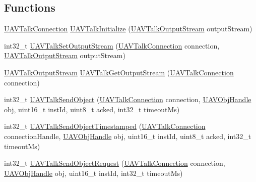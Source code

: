 \subsection*{\-Functions}
\begin{DoxyCompactItemize}
\item 
\hyperlink{group___u_a_v_talk_gaeff1721eaebd4ab306057b4017f23f36}{\-U\-A\-V\-Talk\-Connection} \hyperlink{group___u_a_v_talk_ga91e20b57ed132bab36c9ca723d9bdac4}{\-U\-A\-V\-Talk\-Initialize} (\hyperlink{group___u_a_v_talk_ga0c67fb4d23157d56fe1982e4788938c7}{\-U\-A\-V\-Talk\-Output\-Stream} output\-Stream)
\item 
int32\-\_\-t \hyperlink{group___u_a_v_talk_ga33f8221bbddbf94c7379c3230eac1501}{\-U\-A\-V\-Talk\-Set\-Output\-Stream} (\hyperlink{group___u_a_v_talk_gaeff1721eaebd4ab306057b4017f23f36}{\-U\-A\-V\-Talk\-Connection} connection, \hyperlink{group___u_a_v_talk_ga0c67fb4d23157d56fe1982e4788938c7}{\-U\-A\-V\-Talk\-Output\-Stream} output\-Stream)
\item 
\hyperlink{group___u_a_v_talk_ga0c67fb4d23157d56fe1982e4788938c7}{\-U\-A\-V\-Talk\-Output\-Stream} \hyperlink{group___u_a_v_talk_ga2f8c8d67e642f7df90500f38273baa61}{\-U\-A\-V\-Talk\-Get\-Output\-Stream} (\hyperlink{group___u_a_v_talk_gaeff1721eaebd4ab306057b4017f23f36}{\-U\-A\-V\-Talk\-Connection} connection)
\item 
int32\-\_\-t \hyperlink{group___u_a_v_talk_gab4fe52d9c33088b7ebbac9ad4e11b9de}{\-U\-A\-V\-Talk\-Send\-Object} (\hyperlink{group___u_a_v_talk_gaeff1721eaebd4ab306057b4017f23f36}{\-U\-A\-V\-Talk\-Connection} connection, \hyperlink{targets_2_u_a_v_objects_2inc_2uavobjectmanager_8h_a279053e22be53ce9f895043aaeb91e3b}{\-U\-A\-V\-Obj\-Handle} obj, uint16\-\_\-t inst\-Id, uint8\-\_\-t acked, int32\-\_\-t timeout\-Ms)
\item 
int32\-\_\-t \hyperlink{group___u_a_v_talk_gad5aea81015d8dd5ed7d474ac87fe58fc}{\-U\-A\-V\-Talk\-Send\-Object\-Timestamped} (\hyperlink{group___u_a_v_talk_gaeff1721eaebd4ab306057b4017f23f36}{\-U\-A\-V\-Talk\-Connection} connection\-Handle, \hyperlink{targets_2_u_a_v_objects_2inc_2uavobjectmanager_8h_a279053e22be53ce9f895043aaeb91e3b}{\-U\-A\-V\-Obj\-Handle} obj, uint16\-\_\-t inst\-Id, uint8\-\_\-t acked, int32\-\_\-t timeout\-Ms)
\item 
int32\-\_\-t \hyperlink{group___u_a_v_talk_gaa69251603e3426610051dc19b3a68494}{\-U\-A\-V\-Talk\-Send\-Object\-Request} (\hyperlink{group___u_a_v_talk_gaeff1721eaebd4ab306057b4017f23f36}{\-U\-A\-V\-Talk\-Connection} connection, \hyperlink{targets_2_u_a_v_objects_2inc_2uavobjectmanager_8h_a279053e22be53ce9f895043aaeb91e3b}{\-U\-A\-V\-Obj\-Handle} obj, uint16\-\_\-t inst\-Id, int32\-\_\-t timeout\-Ms)

\end{DoxyCompactItemize}
